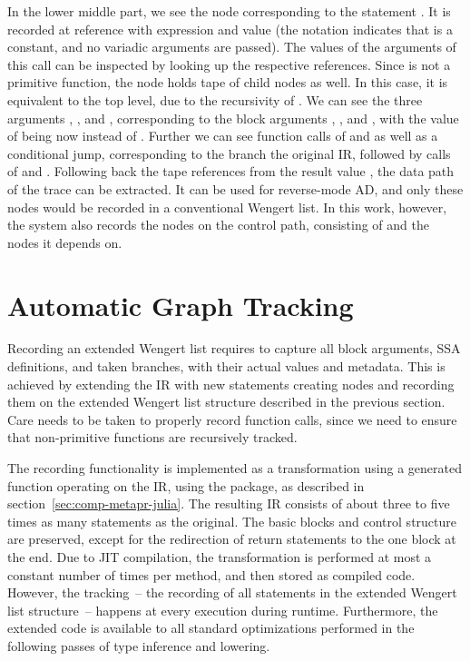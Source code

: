 In the lower middle part, we see the node corresponding to the statement .  It is recorded at reference  with expression  and value
 (the notation  indicates that  is a constant, and
no variadic arguments are passed). The values of the arguments of this call can be inspected by
looking up the respective references.  Since  is not a primitive function, the node
holds tape of child nodes as well.  In this case, it is equivalent to the top level, due to the
recursivity of . We can see the three arguments , , and ,
corresponding to the block arguments , , and , with the value of
 being now  instead of .  Further we can see function calls of
 and \jlinl{<} as well as a conditional jump, corresponding to the branch the original
IR, followed by calls of \jlinl{+} and . Following back the tape references from the
result value , the data path of the trace can be extracted.  It can be used for
reverse-mode AD, and only these nodes would be recorded in a conventional Wengert list.  In this
work, however, the system also records the nodes on the control path, consisting of  and
the nodes it depends on.


\section{Automatic Graph Tracking}
\label{sec:autom-graph-track}

Recording an extended Wengert list requires to capture all block arguments, SSA definitions, and
taken branches, with their actual values and metadata. This is achieved by extending the IR with new
statements creating nodes and recording them on the extended Wengert list structure described in the
previous section. Care needs to be taken to properly record function calls, since we need to ensure
that non-primitive functions are recursively tracked.

The recording functionality is implemented as a transformation using a generated function operating
on the IR, using the  package, as described in
section~\ref{sec:comp-metapr-julia}.  The resulting IR consists of about three to five times as many
statements as the original.  The basic blocks and control structure are preserved, except for the
redirection of return statements to the one block at the end.  Due to JIT compilation, the
transformation is performed at most a constant number of times per method, and then stored as
compiled code.  However, the tracking~-- the recording of all statements in the extended Wengert
list structure~-- happens at every execution during runtime.  Furthermore, the extended code is
available to all standard optimizations performed in the following passes of type inference and
lowering.

